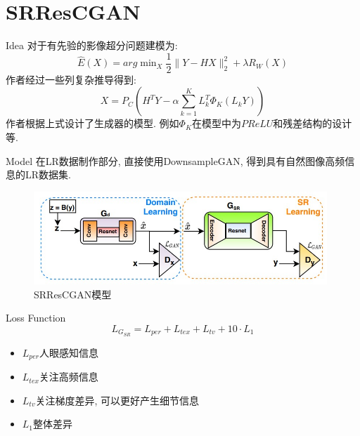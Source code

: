 \section{SRResCGAN}

\begin{frame}{Idea}
    对于有先验的影像超分问题建模为:
    \begin{equation*}
        \hat{E}(X) = arg \min\nolimits_{X} \frac{1}{2}\parallel Y-HX \parallel_{2}^{2} + \lambda R_{W}(X)
    \end{equation*}
    作者经过一些列复杂推导得到:
    \begin{equation*}
        X = P_{C}(H^{T}Y-\alpha \sum_{k=1}^{K} L_{k}^{T}\Phi_{K}(L_{k}Y))
    \end{equation*}
    作者根据上式设计了生成器的模型. 例如$\Phi_{K}$在模型中为$PReLU$和残差结构的设计等.
\end{frame}

\begin{frame}{Model}
    在LR数据制作部分, 直接使用DownsampleGAN, 得到具有自然图像高频信息的LR数据集. 
    \begin{figure}
        \centering
        \includegraphics[height=3.5cm]{pic/pic0201.jpg}
        \caption{SRResCGAN模型}
        \label{fig:0201}
    \end{figure}
\end{frame}

\begin{frame}{Loss Function}
    \[ L_{G_{SR}} = L_{per} + L_{tex} + L_{tv} + 10\cdot L_{1} \]
    \begin{itemize}
        \item $L_{per}$人眼感知信息
        \item $L_{tex}$关注高频信息
        \item $L_{tv}$关注梯度差异, 可以更好产生细节信息
        \item $L_{1}$整体差异
    \end{itemize}
\end{frame}